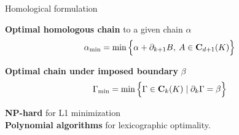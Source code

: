 \begin{frame}{Homological formulation}
\scriptsize

\begin{minipage}[c]{0.55\linewidth}
\textbf{Optimal homologous chain} to a given chain $\alpha$
\begin{equation*}
	\alpha_{\min} = \min \Big\{ \alpha + \partial_{k+1} B, \: A \in \mathbf{C}_{d+1}(K) \Big\}
\end{equation*}

\textbf{Optimal chain under imposed boundary} $\beta$
\begin{equation*}
	\Gamma_{\min} = \min \Big\{ \Gamma \in \mathbf{C}_k(K) \mid \partial_k \Gamma = \beta \Big\}
\end{equation*}
\end{minipage}%
\hfill%
\begin{minipage}[c]{0.40\linewidth}
\end{minipage}

\pause
\vspace{1cm}
\textbf{NP-hard} for L1 minimization \cite{chen_HardnessResultsHomology_2011} \\
\pause
\textbf{Polynomial algorithms} for lexicographic optimality.
\end{frame}

